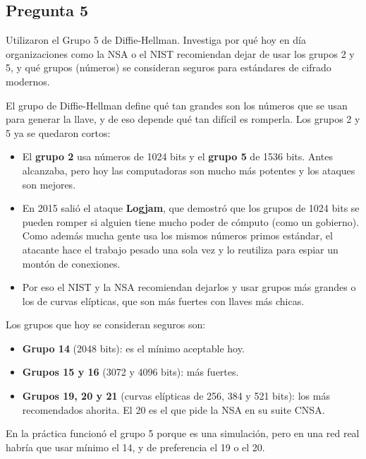 \subsection{Pregunta 5}

Utilizaron el Grupo 5 de Diffie-Hellman. Investiga por qué hoy en día organizaciones como la NSA o el NIST recomiendan dejar de usar los grupos 2 y 5, y qué grupos (números) se consideran seguros para estándares de cifrado modernos.

\begin{respuesta}
El grupo de Diffie-Hellman define qué tan grandes son los números que se usan
para generar la llave, y de eso depende qué tan difícil es romperla. Los grupos
2 y 5 ya se quedaron cortos:

\begin{itemize}
    \item El \textbf{grupo 2} usa números de 1024 bits y el \textbf{grupo 5} de
    1536 bits. Antes alcanzaba, pero hoy las computadoras son mucho más
    potentes y los ataques son mejores.
    \item En 2015 salió el ataque \textbf{Logjam}, que demostró que los grupos
    de 1024 bits se pueden romper si alguien tiene mucho poder de cómputo (como
    un gobierno). Como además mucha gente usa los mismos números primos
    estándar, el atacante hace el trabajo pesado una sola vez y lo reutiliza
    para espiar un montón de conexiones.
    \item Por eso el NIST y la NSA recomiendan dejarlos y usar grupos más
    grandes o los de curvas elípticas, que son más fuertes con llaves más
    chicas.
\end{itemize}

Los grupos que hoy se consideran seguros son:

\begin{itemize}
    \item \textbf{Grupo 14} (2048 bits): es el mínimo aceptable hoy.
    \item \textbf{Grupos 15 y 16} (3072 y 4096 bits): más fuertes.
    \item \textbf{Grupos 19, 20 y 21} (curvas elípticas de 256, 384 y 521 bits):
    los más recomendados ahorita. El 20 es el que pide la NSA en su suite CNSA.
\end{itemize}

En la práctica funcionó el grupo 5 porque es una simulación, pero en una red
real habría que usar mínimo el 14, y de preferencia el 19 o el 20.
\end{respuesta}
